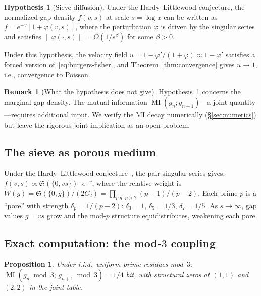 \documentclass[11pt, a4paper]{amsart}
\theoremstyle{plain}
\newtheorem{proposition}[theorem]{Proposition}
\theoremstyle{definition}
\newtheorem{remark}[theorem]{Remark}
\newtheorem{hypothesis}[theorem]{Hypothesis}
\newcommand{\MI}{\operatorname{MI}}
\newcommand{\fS}{\mathfrak{S}}
\begin{document}
\begin{hypothesis}[Sieve diffusion]
\label{hyp:sieve}
Under the Hardy--Littlewood conjecture, the normalized gap density $f(v, s)$ at scale $s = \log x$ 
can be written as $f = e^{-v}[1 + \varphi(v,s)]$, where the perturbation $\varphi$ is driven by the 
singular series and satisfies $\|\varphi(\cdot,s)\| = O(1/s^\beta)$ for some $\beta > 0$.
\end{hypothesis}

Under this hypothesis, the velocity field $u = 1 - \varphi'/(1+\varphi) \approx 1 - \varphi'$ satisfies a 
forced version of~\eqref{eq:burgers-fisher}, and Theorem~\ref{thm:convergence} gives $u \to 1$, i.e., 
convergence to Poisson.

\begin{remark}[What the hypothesis does not give]
Hypothesis~\ref{hyp:sieve} concerns the marginal gap density.
The mutual information $\MI(g_n; g_{n+1})$---a joint quantity---requires additional input.
We verify the MI decay numerically (\S\ref{sec:numerics}) but leave the rigorous joint implication as an 
open problem.
\end{remark}

\subsection{The sieve as porous medium}

Under the Hardy--Littlewood conjecture~\cite{HL1923}, the pair singular series gives:
$f(v,s) \propto \fS(\{0, vs\}) \cdot e^{-v}$,
where the relative weight is $W(g) = \fS(\{0,g\})/(2C_2) = \prod_{p|g,\,p>2} (p{-}1)/(p{-}2)$.
Each prime $p$ is a ``pore'' with strength $\delta_p = 1/(p{-}2)$: $\delta_3 = 1$, $\delta_5 = 1/3$, $\delta_7 = 1/5$.
As $s \to \infty$, gap values $g = vs$ grow and the mod-$p$ structure equidistributes, weakening each pore.

\subsection{Exact computation: the mod-$3$ coupling}

\begin{proposition}\label{prop:mod3}
Under i.i.d.\ uniform prime residues mod~$3$:
$\MI(g_n \bmod 3;\, g_{n+1} \bmod 3) = 1/4$ bit,
with structural zeros at $(1,1)$ and $(2,2)$ in the joint table.
\end{proposition}
\end{document}
